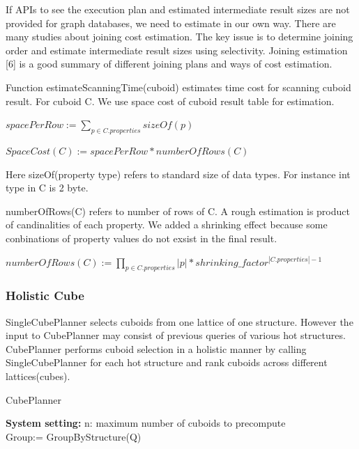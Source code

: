 If APIs to see the execution plan and estimated intermediate result sizes are not provided for graph databases, we need to estimate in our own way. There are many studies about joining cost estimation. The key issue is to determine joining order and estimate intermediate result sizes using selectivity. Joining estimation [6] is a good summary of different joining plans and ways of cost estimation. 

Function estimateScanningTime(cuboid) estimates time cost for scanning cuboid result. For cuboid C. We use space cost of cuboid result table for estimation. 

 $spacePerRow:= 
 \displaystyle{\sum_{p\in C.properties}sizeOf(p)}$
 
$SpaceCost(C):= spacePerRow *  numberOfRows(C)$
 
Here sizeOf(property type) refers to standard size of data types. For instance int type in C is 2 byte.

numberOfRows(C) refers to number of rows of C. A rough estimation is product of candinalities of each property.  We added a shrinking effect because some conbinations of property values do not exsist in the final result. 
 
$numberOfRows(C):= \displaystyle{\prod_{p\in C.properties}|p|} * shrinking\_factor^{|C.properties|-1}$

\subsubsection{Holistic Cube}

SingleCubePlanner selects cuboids from one lattice of one structure. However the input to CubePlanner may consist of previous queries of various hot structures. CubePlanner performs cuboid selection in a holistic manner by calling SingleCubePlanner for each hot structure and rank cuboids across different lattices(cubes). 

\begin{algorithm}[H]
	\caption{CubePlanner}
	\LinesNumbered 
	\textbf{System setting:} n: maximum number of cuboids to precompute\\ 
	Group:= GroupByStructure(Q) \;
	
	
\end{algorithm}
\clearpage

